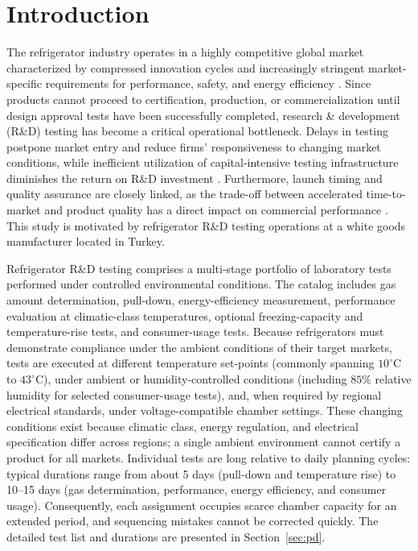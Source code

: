 
\section{Introduction}
\label{sec:intro}

The refrigerator industry operates in a highly competitive global market characterized by compressed innovation cycles and increasingly stringent market-specific requirements for performance, safety, and energy efficiency \citep{IEA2021,IEC60335-1,IEC60335-2-24,IEC62552}. Since products cannot proceed to certification, production, or commercialization until design approval tests have been successfully completed, research \& development (R\&D) testing has become a critical operational bottleneck. Delays in testing postpone market entry and reduce firms' responsiveness to changing market conditions, while inefficient utilization of capital-intensive testing infrastructure diminishes the return on R\&D investment \citep{OECD_MSTI2024,OECD_MSTI2025}. Furthermore, launch timing and quality assurance are closely linked, as the trade-off between accelerated time-to-market and product quality has a direct impact on commercial performance \citep{KimKoenigsbergOfek2022}. This study is motivated by refrigerator R\&D testing operations at a white goods manufacturer located in Turkey.

Refrigerator R\&D testing comprises a multi-stage portfolio of laboratory tests performed under controlled environmental conditions. The catalog includes gas amount determination, pull-down, energy-efficiency measurement, performance evaluation at climatic-class temperatures, optional freezing-capacity and temperature-rise tests, and consumer-usage tests. Because refrigerators must demonstrate compliance under the ambient conditions of their target markets, tests are executed at different temperature set-points (commonly spanning \(10^\circ\mathrm{C}\) to \(43^\circ\mathrm{C}\)), under ambient or humidity-controlled conditions (including \(85\%\) relative humidity for selected consumer-usage tests), and, when required by regional electrical standards, under voltage-compatible chamber settings. These changing conditions exist because climatic class, energy regulation, and electrical specification differ across regions; a single ambient environment cannot certify a product for all markets. Individual tests are long relative to daily planning cycles: typical durations range from about 5 days (pull-down and temperature rise) to 10--15 days (gas determination, performance, energy efficiency, and consumer usage). Consequently, each assignment occupies scarce chamber capacity for an extended period, and sequencing mistakes cannot be corrected quickly. The detailed test list and durations are presented in Section~\ref{sec:pd}.


